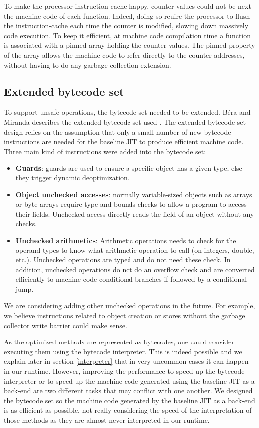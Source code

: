 \documentclass[a4paper,12pt,twoside]{../includes/ThesisStyle}
\begin{document}
To make the processor instruction-cache happy, counter values could not be next the machine code of each function. Indeed, doing so reuire the processor to flush the instruction-cache each time the counter is modified, slowing down massively code execution. To keep it efficient, at machine code compilation time a function is associated with a pinned array holding the counter values. The pinned property of the array allows the machine code to refer directly to the counter addresses, without having to do any garbage collection extension.


\subsection{Extended bytecode set}

To support unsafe operations, the bytecode set needed to be extended. B\'era and Miranda describes the extended bytecode set used \cite{Bera14a}. The extended bytecode set design relies on the assumption that only a small number of new bytecode instructions are needed for the baseline JIT to produce efficient machine code. Three main kind of instructions were added into the bytecode set:
\begin{itemize}
\item \textbf{Guards}: guards are used to ensure a specific object has a given type, else they trigger dynamic deoptimization.
\item \textbf{Object unchecked accesses}: normally variable-sized objects such as arrays or byte arrays require type and bounds checks to allow a program to access their fields. Unchecked access directly reads the field of an object without any checks.
\item \textbf{Unchecked arithmetics}: Arithmetic operations needs to check for the operand types to know what arithmetic operation to call (on integers, double, etc.). Unchecked operations are typed and do not need these check. In addition, unchecked operations do not do an overflow check and are converted efficiently to machine code conditional branches if followed by a conditional jump.
\end{itemize}

We are considering adding other unchecked operations in the future. For example, we believe instructions related to object creation or stores without the garbage collector write barrier could make sense.

As the optimized methods are represented as bytecodes, one could consider executing them using the bytecode interpreter. This is indeed possible and we explain later in section \ref{interpreter} that in very uncommon cases it can happen in our runtime. However, improving the performance to speed-up the bytecode interpreter or to speed-up the machine code generated using the baseline JIT as a back-end are two different tasks that may conflict with one another. We designed the bytecode set so the machine code generated by the baseline JIT as a back-end is as efficient as possible, not really considering the speed of the interpretation of those methods as they are almost never interpreted in our runtime.
\end{document}
